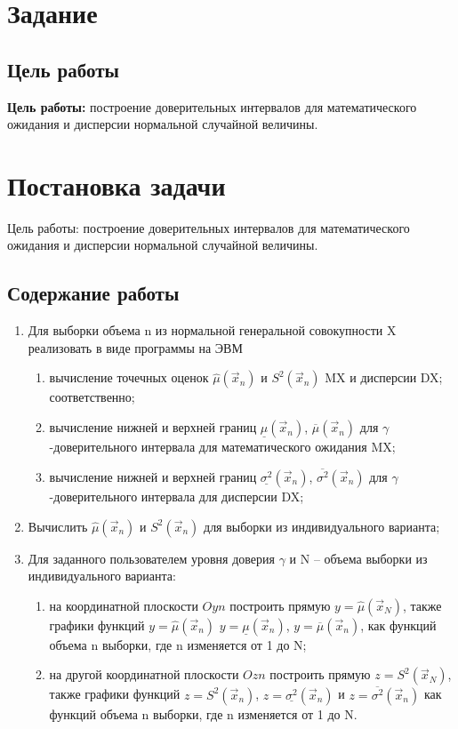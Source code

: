 \chapter{Задание}
\section{Цель работы}
\textbf{Цель работы:} построение доверительных интервалов для математического ожидания и дисперсии нормальной случайной величины.
\chapter{Постановка задачи}
Цель работы: построение доверительных интервалов для математического ожидания и дисперсии нормальной случайной величины.
\section{Содержание работы}
\begin{enumerate}
\item Для выборки объема n из нормальной генеральной совокупности X реализовать в виде программы на ЭВМ
	\begin{enumerate}
		\item вычисление точечных оценок $\hat{\mu}(\vec{x}_n)$ и $S^2(\vec{x}_n)$
		MX и дисперсии DX; соответственно;
		\item вычисление нижней и верхней границ $\underline{{\mu}}(\vec{x}_n)$, $\overline{{\mu}}(\vec{x}_n)$ для \newline $\gamma$-доверительного интервала для
		математического ожидания MX;
		\item вычисление нижней и верхней границ 
		$\underline{\sigma^2}(\vec{x}_n)$, 
		$\overline{\sigma^2}(\vec{x}_n)$ для \newline $\gamma$-доверительного интервала для
		дисперсии DX;
	\end{enumerate}
	\item Вычислить $\hat{\mu}(\vec{x}_n)$ и $S^2(\vec{x}_n)$ для выборки из индивидуального варианта;
	\item Для заданного пользователем уровня доверия $\gamma$ и N – объема выборки из индивидуального варианта:
	\begin{enumerate}
		\item на координатной плоскости $Oyn$ построить прямую $y=\hat{\mu}(\vec{x}_N)$, также графики функций $y=\hat{\mu}(\vec{x}_n)$
			$y=\underline{{\mu}}(\vec{x}_n)$, $y=\overline{{\mu}}(\vec{x}_n)$,  как функций объема n выборки, где n изменяется от 1 до N;
		\item на другой координатной плоскости $Ozn$ построить прямую $z = S^2(\vec{x}_N)$, также графики
			функций $z = S^2(\vec{x}_n)$, $z = \underline{\sigma^2}(\vec{x}_n)$
			и $z = \overline{\sigma^2}(\vec{x}_n)$ как функций объема n выборки, где n
			изменяется от 1 до N.
	\end{enumerate}
\end{enumerate}

